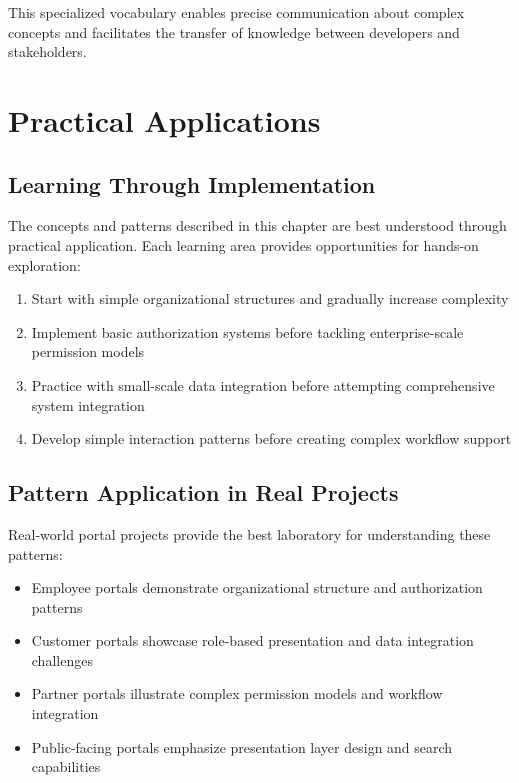 This specialized vocabulary enables precise communication about complex concepts and facilitates the transfer of knowledge between developers and stakeholders.

\section{Practical Applications}

\subsection{Learning Through Implementation}

The concepts and patterns described in this chapter are best understood through practical application. Each learning area provides opportunities for hands-on exploration:

\begin{enumerate}
\item Start with simple organizational structures and gradually increase complexity
\item Implement basic authorization systems before tackling enterprise-scale permission models
\item Practice with small-scale data integration before attempting comprehensive system integration
\item Develop simple interaction patterns before creating complex workflow support
\end{enumerate}

\subsection{Pattern Application in Real Projects}

Real-world portal projects provide the best laboratory for understanding these patterns:

\begin{itemize}
\item Employee portals demonstrate organizational structure and authorization patterns
\item Customer portals showcase role-based presentation and data integration challenges
\item Partner portals illustrate complex permission models and workflow integration
\item Public-facing portals emphasize presentation layer design and search capabilities
\end{itemize}

